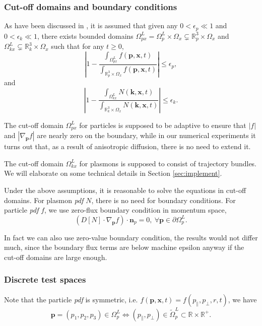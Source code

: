 \documentclass{article}
\numberwithin{equation}{section}
\begin{document}
\subsubsection*{Cut-off domains and boundary conditions}
As have been discussed in \cite{huang2023conservative}, it is assumed that given any $0<\epsilon_p \ll 1$ and $0 < \epsilon_k \ll 1$, there exists bounded domains $\Omega_{px}^{L}=\Omega_{p}^{L}\times\Omega_{x}\subsetneq\mathbb{R}_{p}^{3}\times\Omega_{x}$
and $\Omega_{kx}^{L}\subsetneq\mathbb{R}_{k}^{3}\times\Omega_{x}$ such that  for any $t\geq0$,
\begin{equation*}
    \left|1-\frac{\int_{\Omega_{px}^{L}}f(\mathbf{p},\mathbf{x},t)}{\int_{\mathbb{R}_{p}^{3}\times\Omega_{x}}f(\mathbf{p},\mathbf{x},t)}\right|\leq\epsilon_{p},
\end{equation*}
and
\begin{equation*}
    \left|1-\frac{\int_{\Omega_{kx}^{L}}N(\mathbf{k},\mathbf{x},t)}{\int_{\mathbb{R}_{k}^{3}\times\Omega_{x}}N(\mathbf{k},\mathbf{x},t)}\right|\leq\epsilon_{k}.
\end{equation*}

The cut-off domain $\Omega_{px}^{L}$ for particles is supposed to be adaptive to ensure that $|f|$ and $|\nabla_{\mathbf{p}}f|$ are nearly zero on the boundary, while in our numerical experiments it turns out that, as a result of anisotropic diffusion, there is no need to extend it.

The cut-off domain $\Omega_{kx}^{L}$ for plasmons is supposed to consist of trajectory bundles. We will elaborate on some technical details in Section \ref{sec:implement}.

Under the above assumptions, it is reasonable to solve the equations in cut-off domains. For plasmon \textit{pdf} $N$, there is no need for boundary conditions. For particle \textit{pdf} $f$, we use zero-flux boundary condition in momentum space,
\begin{equation*}
    \left(D[N] \cdot \nabla_{\mathbf{p}}f\right)\cdot\mathbf{n}_{p}=0,\ \forall\mathbf{p}\in\partial\Omega_{p}^{L}.
\end{equation*}

In fact we can also use zero-value boundary condition, the results would not differ much, since the boundary flux terms are below machine epsilon anyway if the cut-off domains are large enough. 

\subsubsection*{Discrete test spaces}
Note that the particle \textit{pdf} is symmetric, i.e. $f(\mathbf{p}, \mathbf{x}, t) = f(p_{\parallel}, p_{\perp}, r, t)$, we have
\begin{equation*}
    \mathbf{p}=(p_{1},p_{2},p_{3})\in\Omega_{p}^{L}\Leftrightarrow(p_{\parallel},p_{\perp})\in\tilde{\Omega}_{p}^{L}\subset\mathbb{R}\times\mathbb{R}^{+}.
\end{equation*}
\end{document}
